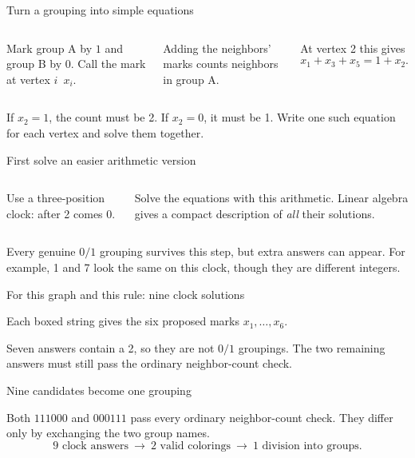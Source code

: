 \begin{frame}{Turn a grouping into simple equations}
\begin{columns}[c]
Mark group A by $1$ and group B by $0$.
Call the mark at vertex $i$ \,$x_i$.

Adding the neighbors' marks counts neighbors in group A.

At vertex 2 this gives
\[
       x_1+x_3+x_5=1+x_2.
\]
\end{columns}
If $x_2=1$, the count must be 2. If $x_2=0$, it must be 1.
Write one such equation for each vertex and solve them together.
\end{frame}

\begin{frame}{First solve an easier arithmetic version}
\begin{columns}[c]
Use a three-position clock: after 2 comes 0.

Solve the equations with this arithmetic.
Linear algebra gives a compact description of \emph{all} their solutions.
\end{columns}
Every genuine $0/1$ grouping survives this step, but extra answers can appear.
For example, 1 and 7 look the same on this clock, though they are different integers.
\end{frame}

\begin{frame}{For this graph and this rule: nine clock solutions}
\begin{center}
\end{center}
Each boxed string gives the six proposed marks $x_1,\ldots,x_6$.

Seven answers contain a 2, so they are not $0/1$ groupings.
The two remaining answers must still pass the ordinary neighbor-count check.
\end{frame}

\begin{frame}{Nine candidates become one grouping}
\begin{center}
\end{center}
Both $111000$ and $000111$ pass every ordinary neighbor-count check.
They differ only by exchanging the two group names.
\[
 \boxed{9\text{ clock answers}}\ \longrightarrow\
 \boxed{2\text{ valid colorings}}\ \longrightarrow\
 \boxed{1\text{ division into groups}}.
\]
\end{frame}

